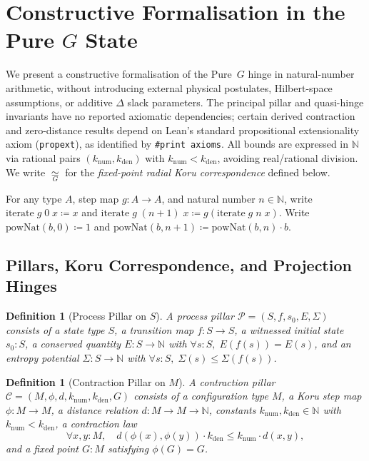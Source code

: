 \documentclass[12pt,a4paper]{article}
\newcommand{\koruG}{\mathrel{\underset{G}{\simeq}}}
\newtheorem{definition}[thm]{Definition}
\begin{document}
\section{Constructive Formalisation in the Pure $G$ State}
\label{sec:pure-g-formalisation}

We present a constructive formalisation of the Pure~$G$ hinge in natural-number arithmetic, without introducing external physical postulates, Hilbert-space assumptions, or additive $\Delta$ slack parameters. The principal pillar and quasi-hinge invariants have no reported axiomatic dependencies; certain derived contraction and zero-distance results depend on Lean's standard propositional extensionality axiom (\texttt{propext}), as identified by \texttt{\#print axioms}. All bounds are expressed in $\mathbb{N}$ via rational pairs $(k_{\mathrm{num}}, k_{\mathrm{den}})$ with $k_{\mathrm{num}} < k_{\mathrm{den}}$, avoiding real/rational division. We write $\koruG$ for the \emph{fixed-point radial Koru correspondence} defined below.

For any type $A$, step map $g : A \to A$, and natural number $n \in \mathbb{N}$, write $\mathrm{iterate}\;g\;0\;x \coloneq x$ and $\mathrm{iterate}\;g\;(n+1)\;x \coloneq g(\mathrm{iterate}\;g\;n\;x)$. Write $\mathrm{powNat}(b, 0) \coloneq 1$ and $\mathrm{powNat}(b, n+1) \coloneq \mathrm{powNat}(b, n) \cdot b$.

\subsection{Pillars, Koru Correspondence, and Projection Hinges}

\begin{definition}[Process Pillar on $S$]
A \emph{process pillar} $\mathcal{P} = (S, f, s_0, E, \Sigma)$ consists of a state type $S$, a transition map $f : S \to S$, a witnessed initial state $s_0 : S$, a conserved quantity $E : S \to \mathbb{N}$ with $\forall s : S,\; E(f(s)) = E(s)$, and an entropy potential $\Sigma : S \to \mathbb{N}$ with $\forall s : S,\; \Sigma(s) \le \Sigma(f(s))$.
\end{definition}

\begin{definition}[Contraction Pillar on $M$]
A \emph{contraction pillar} $\mathcal{C} = (M, \phi, d, k_{\mathrm{num}}, k_{\mathrm{den}}, G)$ consists of a configuration type $M$, a Koru step map $\phi : M \to M$, a distance relation $d : M \to M \to \mathbb{N}$, constants $k_{\mathrm{num}}, k_{\mathrm{den}} \in \mathbb{N}$ with $k_{\mathrm{num}} < k_{\mathrm{den}}$, a contraction law
\[
\forall x, y : M,\quad d(\phi(x), \phi(y)) \cdot k_{\mathrm{den}} \le k_{\mathrm{num}} \cdot d(x, y),
\]
and a fixed point $G : M$ satisfying $\phi(G) = G$.
\end{definition}
\end{document}
